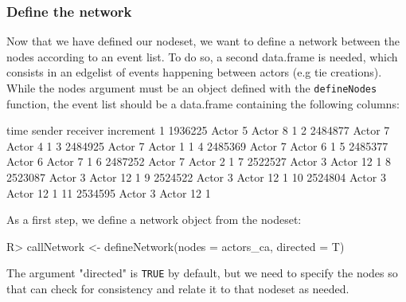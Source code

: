 \documentclass[article]{jss}
\begin{document}
% 
% 
% 
% 
% 



\subsubsection[Network]{\textbf{Define the network}} \label{subsubsec:networks}


Now that we have defined our nodeset, we want to define a network between the nodes according to an event list.
To do so, a second data.frame is needed, which consists in an edgelist of events happening between actors (e.g tie creations). While the nodes argument must be an object defined with the \texttt{defineNodes} function, the event list should be a data.frame containing the following columns:

%
\begin{Schunk}
\begin{Soutput}
      time  sender receiver increment
1  1936225 Actor 5  Actor 8         1
2  2484877 Actor 7  Actor 4         1
3  2484925 Actor 7  Actor 1         1
4  2485369 Actor 7  Actor 6         1
5  2485377 Actor 6  Actor 7         1
6  2487252 Actor 7  Actor 2         1
7  2522527 Actor 3 Actor 12         1
8  2523087 Actor 3 Actor 12         1
9  2524522 Actor 3 Actor 12         1
10 2524804 Actor 3 Actor 12         1
11 2534595 Actor 3 Actor 12         1
\end{Soutput}
\end{Schunk}
%

As a first step, we define a network object from the nodeset: 
%
\begin{Schunk}
\begin{Sinput}
R> callNetwork <- defineNetwork(nodes = actors_ca, directed = T)
\end{Sinput}
\end{Schunk}
%
 The argument "directed" is \texttt{TRUE} by default, but we need to specify the nodes so that  can check for consistency and relate it to that nodeset as needed.
 
\end{document}
